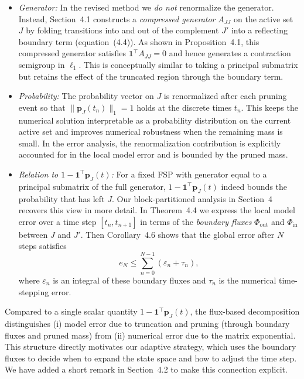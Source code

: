 \documentclass[11pt]{article}
\begin{document}
\begin{itemize}
  \item \emph{Generator:} In the revised method we \emph{do not} renormalize the
        generator. Instead, Section~4.1 constructs a \emph{compressed generator}
        $A_{JJ}$ on the active set $J$ by folding transitions into and out of
        the complement $J'$ into a reflecting boundary term (equation~(4.4)). As
        shown in Proposition~4.1, this compressed generator satisfies
        $\mathbf{1}^\top A_{JJ} = 0$ and hence generates a contraction
        semigroup in $\ell_1$. This is conceptually similar to taking a principal
        submatrix but retains the effect of the truncated region through the
        boundary term.

  \item \emph{Probability:} The probability vector on $J$ is renormalized after
        each pruning event so that $\|\mathbf{p}_J(t_n)\|_1 = 1$ holds at the
        discrete times $t_n$. This keeps the numerical solution interpretable as
        a probability distribution on the current active set and improves
        numerical robustness when the remaining mass is small. In the error
        analysis, the renormalization contribution is explicitly accounted for in
        the local model error and is bounded by the pruned mass.

  \item \emph{Relation to $1-\mathbf{1}^\top\mathbf{p}_J(t)$:} For a fixed FSP
        with generator equal to a principal submatrix of the full generator,
        $1-\mathbf{1}^\top\mathbf{p}_J(t)$ indeed bounds the probability that has
        left $J$. Our block-partitioned analysis in Section~4 recovers this view in
        more detail. In Theorem~4.4 we express the local model error over a time
        step $[t_n,t_{n+1}]$ in terms of the \emph{boundary fluxes}
        $\Phi_{\mathrm{out}}$ and $\Phi_{\mathrm{in}}$ between $J$ and $J'$. Then
        Corollary~4.6 shows that the global error after $N$ steps satisfies
        \[
          e_N \le \sum_{n=0}^{N-1} (\varepsilon_n + \tau_n),
        \]
        where $\varepsilon_n$ is an integral of these boundary fluxes and $\tau_n$
        is the numerical time-stepping error.
\end{itemize}

Compared to a single scalar quantity $1-\mathbf{1}^\top\mathbf{p}_J(t)$, the
flux-based decomposition distinguishes (i) model error due to truncation and
pruning (through boundary fluxes and pruned mass) from (ii) numerical error due to
the matrix exponential. This structure directly motivates our adaptive strategy,
which uses the boundary fluxes to decide when to expand the state space and how to
adjust the time step. We have added a short remark in Section~4.2 to make this
connection explicit.
\end{document}

